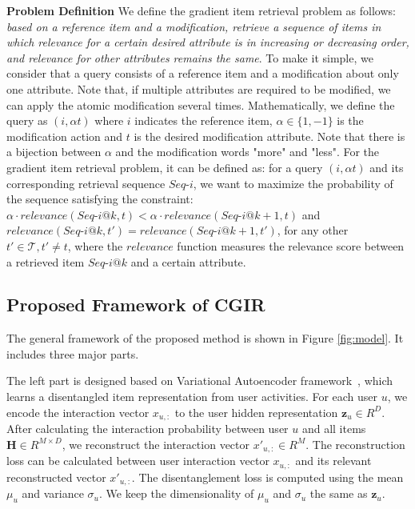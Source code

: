 \textbf{Problem Definition} We define the gradient item retrieval problem as follows: \textit{based on a reference item and a modification, retrieve a sequence of items in which relevance for a certain desired attribute is in increasing or decreasing order, and relevance for other attributes remains the same}. To make it simple, we consider that a query consists of a reference item and a modification about only one attribute. Note that, if multiple attributes are required to be modified, we can apply the atomic modification several times. Mathematically, we define the query as $(i, \alpha t)$ where $i$ indicates the reference item, $\alpha \in \{1,-1\}$ is the modification action and $t$ is the desired modification attribute. Note that there is a bijection between $\alpha$ and the modification words "more" and "less". For the gradient item retrieval problem, it can be defined as: for a query $(i, \alpha t)$ and its corresponding retrieval sequence $Seq\text{-}i$, we want to maximize the probability of the sequence satisfying the constraint: $\alpha \cdot relevance(Seq\text{-}i@k,t) < \alpha \cdot relevance(Seq\text{-}i@k+1,t)$ and $ relevance(Seq\text{-}i@k,t') = relevance(Seq\text{-}i@k+1,t')$, for any other $ t' \in \mathcal{T}, t' \neq t$, where the $relevance$ function measures the relevance score between a retrieved item $Seq\text{-}i@k$ and a certain attribute.


\subsection{Proposed Framework of CGIR}
The general framework of the proposed method is shown in Figure \ref{fig:model}. It includes three major parts. 

The left part is designed based on Variational Autoencoder framework~\cite{KingmaW13VAE}, which learns a disentangled item representation from user activities. For each user $u$, we encode the interaction vector $x_{u,:}$ to the user hidden representation $\mathbf{z}_{u} \in R^{D}$. After calculating the interaction probability between user $u$ and all items $\mathbf{H} \in R^{M \times D}$, we reconstruct the interaction vector $x'_{u,:} \in R^{M}$. The reconstruction loss can be calculated between user interaction vector $x_{u,:}$ and its relevant reconstructed vector $x'_{u,:}$. The disentanglement loss is computed using the mean $\mu_{u}$ and variance $\sigma_{u}$.
We keep the dimensionality of $\mu_{u}$ and  $\sigma_{u}$ the same as $\mathbf{z}_{u}$.

